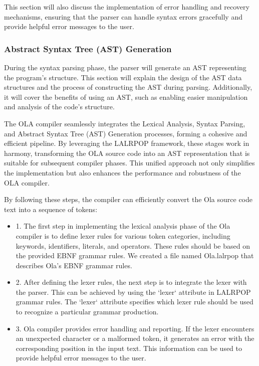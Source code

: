 This section will also discuss the implementation of error handling and recovery mechanisms, ensuring that the parser can handle syntax errors gracefully and provide helpful error messages to the user.

\subsubsection{Abstract Syntax Tree (AST) Generation}
During the syntax parsing phase, the parser will generate an AST representing the program's structure. This section will explain the design of the AST data structures and the process of constructing the AST during parsing. Additionally, it will cover the benefits of using an AST, such as enabling easier manipulation and analysis of the code's structure.

The OLA compiler seamlessly integrates the Lexical Analysis, Syntax Parsing, and Abstract Syntax Tree (AST) Generation processes, forming a cohesive and efficient pipeline. By leveraging the LALRPOP framework, these stages work in harmony, transforming the OLA source code into an AST representation that is suitable for subsequent compiler phases. This unified approach not only simplifies the implementation but also enhances the performance and robustness of the OLA compiler.

By following these steps, the compiler can efficiently convert the Ola source code text into a sequence of tokens:

\begin{itemize}

  \item 1. The first step in implementing the lexical analysis phase of the Ola compiler is to define lexer rules for various token categories, including keywords, identifiers, literals, and operators. These rules should be based on the provided EBNF grammar rules. We created a file named Ola.lalrpop that describes Ola's EBNF grammar rules.

  \item 2. After defining the lexer rules, the next step is to integrate the lexer with the parser. This can be achieved by using the `lexer` attribute in LALRPOP grammar rules. The `lexer` attribute specifies which lexer rule should be used to recognize a particular grammar production.

  \item 3. Ola compiler provides error handling and reporting. If the lexer encounters an unexpected character or a malformed token, it generates an error with the corresponding position in the input text. This information can be used to provide helpful error messages to the user.

\end{itemize}

